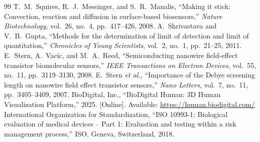 \documentclass[12pt,a4paper,oneside]{report}
\begin{document}
\begin{thebibliography}{99}
 T.~M.~Squires, R.~J.~Messinger, and S.~R.~Manalis, ``Making it stick: Convection, reaction and diffusion in surface-based biosensors,'' \textit{Nature Biotechnology}, vol.~26, no.~4, pp.~417--426, 2008.
 A.~Shrivastava and V.~B.~Gupta, ``Methods for the determination of limit of detection and limit of quantitation,'' \textit{Chronicles of Young Scientists}, vol.~2, no.~1, pp.~21--25, 2011.
 E.~Stern, A.~Vacic, and M.~A.~Reed, ``Semiconducting nanowire field-effect transistor biomolecular sensors,'' \textit{IEEE Transactions on Electron Devices}, vol.~55, no.~11, pp.~3119--3130, 2008.
 E.~Stern \textit{et al.}, ``Importance of the Debye screening length on nanowire field effect transistor sensors,'' \textit{Nano Letters}, vol.~7, no.~11, pp.~3405--3409, 2007.
 BioDigital, Inc., ``BioDigital Human: 3D Human Visualization Platform,'' 2025. [Online]. Available: \url{https://human.biodigital.com/}
 International Organization for Standardization, ``ISO 10993-1: Biological evaluation of medical devices -- Part 1: Evaluation and testing within a risk management process,'' ISO, Geneva, Switzerland, 2018.

\end{thebibliography}
\end{document}
